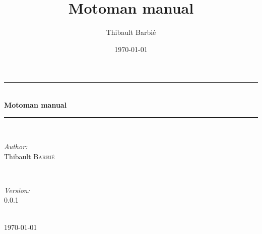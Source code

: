 \documentclass{book}
\title{Motoman manual}
\author{Thibault Barbié}
\date{\today}
\begin{document}
\begin{titlepage}
\newcommand{\HRule}{\rule{\linewidth}{0.5mm}}
\center

\HRule \\[1.5cm]
{ \huge \bfseries Motoman manual}\\[0.4cm] 
\HRule \\[1.5cm]

\begin{minipage}{0.4\textwidth}
\begin{flushleft} \large
\emph{Author:}\\
Thibault \textsc{Barbi\'{e}} %
\end{flushleft}
\end{minipage}
~
\begin{minipage}{0.4\textwidth}
\begin{flushright} \large
\emph{Version:}\\
0.0.1 %
\end{flushright}
\end{minipage}\\[4cm]

{\large \today}\\[3cm] 
\vfill 

\end{titlepage}

\tableofcontents
\newpage


\newpage

\newpage

\end{document}
